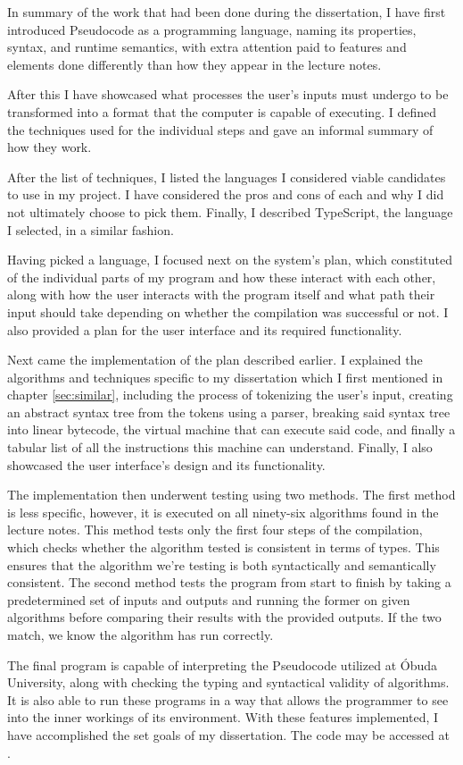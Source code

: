 In summary of the work that had been done during the dissertation, I have first introduced Pseudocode as a programming language, naming its properties, syntax, and runtime semantics, with extra attention paid to features and elements done differently than how they appear in the lecture notes.

After this I have showcased what processes the user's inputs must undergo to be transformed into a format that the computer is capable of executing. I defined the techniques used for the individual steps and gave an informal summary of how they work.

After the list of techniques, I listed the languages I considered viable candidates to use in my project. I have considered the pros and cons of each and why I did not ultimately choose to pick them. Finally, I described TypeScript, the language I selected, in a similar fashion.

Having picked a language, I focused next on the system's plan, which constituted of the individual parts of my program and how these interact with each other, along with how the user interacts with the program itself and what path their input should take depending on whether the compilation was successful or not. I also provided a plan for the user interface and its required functionality.

Next came the implementation of the plan described earlier. I explained the algorithms and techniques specific to my dissertation which I first mentioned in chapter \ref{sec:similar}, including the process of tokenizing the user's input, creating an abstract syntax tree from the tokens using a parser, breaking said syntax tree into linear bytecode, the virtual machine that can execute said code, and finally a tabular list of all the instructions this machine can understand. Finally, I also showcased the user interface's design and its functionality.

The implementation then underwent testing using two methods. The first method is less specific, however, it is executed on all ninety-six algorithms found in the lecture notes. This method tests only the first four steps of the compilation, which checks whether the algorithm tested is consistent in terms of types. This ensures that the algorithm we're testing is both syntactically and semantically consistent. The second method tests the program from start to finish by taking a predetermined set of inputs and outputs and running the former on given algorithms before comparing their results with the provided outputs. If the two match, we know the algorithm has run correctly.

The final program is capable of interpreting the Pseudocode utilized at Óbuda University, along with checking the typing and syntactical validity of algorithms. It is also able to run these programs in a way that allows the programmer to see into the inner workings of its environment. With these features implemented, I have accomplished the set goals of my dissertation. The code may be accessed at {\color{blue}{https://github.com/Nemin32/pseudokod}}.
